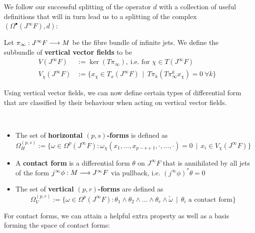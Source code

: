 We follow our successful splitting of the operator $d$ with a collection of useful definitions that will in turn lead us to a splitting of the complex $(\Omega^\bullet(J^\infty F), d)$:

\begin{definition}
Let $\pi_\infty: J^\infty F \longrightarrow M$ be the fibre bundle of infinite jets. We define the subbundle of \textbf{vertical vector fields} to be
\begin{align}
  V(J^\infty F) &:= \ker (T\pi_\infty), \ \text{i.e. for } \chi\in T(J^\infty F)\\
  V_\chi(J^\infty F) &:= \{ x_\chi \in T_x(J^\infty F) \ \ | \ \ T\pi_k(T\pi_\infty^k x_\chi) = 0 \ \forall k \}
\end{align}
\end{definition}

Using vertical vector fields, we can now define certain types of differential form that are classified by their behaviour when acting on vertical vector fields.

\begin{definition}~
\begin{itemize}
  \item The set of \textbf{horizontal $(p,s)$-forms} is defined as
  $$ \Omega^{(p,s)}_H := \{ \omega \in \Omega^p(J^\infty F) : \omega_\chi (x_1, ..., x_{p-s+1}, \cdot, ..., \cdot) = 0 \ \ |\ \  x_i \in V_\chi(J^\infty F) \} $$

  \item A \textbf{contact form} is a differential form $\theta$ on $J^\infty F$ that is annihilated by all jets of the form $j^\infty \phi : M \lra J^\infty F$ via pullback, i.e. $(j^\infty \phi)^* \theta = 0$

  \item The set of \textbf{vertical $(p,r)$-forms} are defined as
  $$ \Omega^{(p,r)}_V := \{ \omega \in \Omega^p(J^\infty F) : \theta_1 \wedge \theta_2 \wedge ... \wedge \theta_r \wedge \widetilde \omega \ \ |\ \  \theta_i \text{ a  contact form} \} $$
\end{itemize}
\end{definition}

For contact forms, we can attain a helpful extra property as well as a basis forming the space of contact forms:

